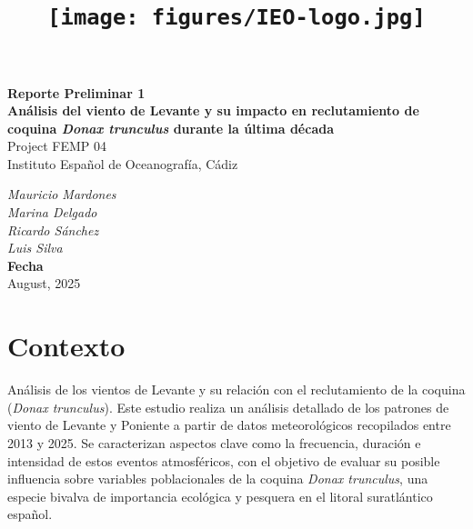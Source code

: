 \documentclass[
]{article}
\title{\texttt{[image: figures/IEO-logo.jpg]}}
\author{}
\date{\vspace{-2.5em}}
\begin{document}
\maketitle



\begin{flushleft}
\Large{\textbf{Reporte Preliminar 1}}\\
\vspace*{2\baselineskip}
\LARGE{\textbf{Análisis del viento de Levante y su impacto en reclutamiento de coquina \textit{Donax trunculus} durante la última década}}\\
\vspace*{5\baselineskip}
\Large{Project FEMP 04}\\
\vspace*{1\baselineskip}
\Large{Instituto Español de Oceanografía, Cádiz }\\
\vspace*{4\baselineskip}
\end{flushleft}
\begin{flushright}
\large{\textit{Mauricio Mardones}}\\
\large{\textit{Marina Delgado}}\\
\large{\textit{Ricardo Sánchez}}\\
\large{\textit{Luis Silva}}\\
\vspace*{1\baselineskip}
\normalsize{\textbf{Fecha}}\\
August, 2025
\end{flushright}



\hypersetup{linkcolor = black}
\newpage
{}

\newpage



\hypersetup{linkcolor = blue}

{
\hypersetup{linkcolor=}
\setcounter{tocdepth}{3}
\tableofcontents
}
\pagebreak

\section{Contexto}\label{contexto}

Análisis de los vientos de Levante y su relación con el reclutamiento de la coquina (\emph{Donax trunculus}). Este estudio realiza un análisis detallado de los patrones de viento de Levante y Poniente a partir de datos meteorológicos recopilados entre 2013 y 2025. Se caracterizan aspectos clave como la frecuencia, duración e intensidad de estos eventos atmosféricos, con el objetivo de evaluar su posible influencia sobre variables poblacionales de la coquina \emph{Donax trunculus}, una especie bivalva de importancia ecológica y pesquera en el litoral suratlántico español.
\end{document}
